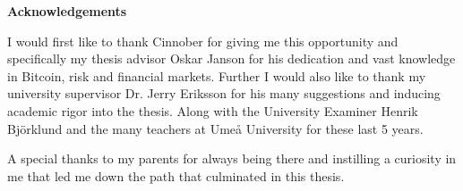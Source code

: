 \vspace*{7cm}

\begin{center}
	\textbf{Acknowledgements}
\end{center} 

I would first like to thank Cinnober for giving me this opportunity and specifically my thesis advisor Oskar Janson for his dedication and vast knowledge in Bitcoin, risk and financial markets.
Further I would also like to thank my university supervisor Dr. Jerry Eriksson for his many suggestions and inducing academic rigor into the thesis. Along with the University Examiner Henrik Bj\"{o}rklund and the many teachers at Umeå University for these last 5 years. 
  
A special thanks to my parents for always being there and instilling a curiosity in me that led me down the path that culminated in this thesis. 
